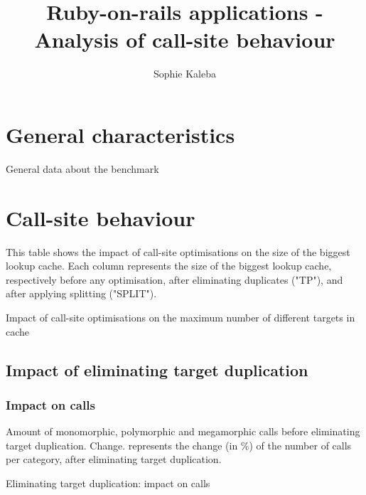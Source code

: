 \documentclass[preprint]{acmart}
\begin{document}
\title{Ruby-on-rails applications - Analysis of call-site behaviour}

\author{Sophie Kaleba}

\maketitle


\section{General characteristics}

\begin{table}[h!]
	\centering
	\resizebox{\linewidth}{!}{
	\GeneralMetrics
	}
	\caption{General data about the benchmark}
\end{table}

\section{Call-site behaviour}

This table shows the impact of call-site optimisations on the size of the biggest lookup cache.
Each column represents the size of the biggest lookup cache, respectively before any optimisation, after eliminating duplicates ("TP"), and after applying splitting ("SPLIT").

\begin{table}[h!]
	\centering
	\Extent
	\caption{Impact of call-site optimisations on the maximum number of different targets in cache}
\end{table}

\subsection{Impact of eliminating target duplication}

\subsubsection{\textbf{Impact on calls}}

Amount of monomorphic, polymorphic and megamorphic calls before eliminating target duplication.
Change. represents the change (in \%) of the number of calls per category, after eliminating target duplication.

\begin{table}[!h]
	\centering
	\BeforeAfterTPCalls
	\caption{Eliminating target duplication: impact on calls}
\end{table}
\end{document}

